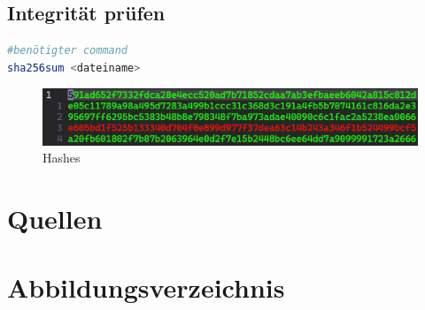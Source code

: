 \documentclass[a4paper]{article}
\begin{document}
\subsection{Integrität prüfen}
\begin{lstlisting}[language=bash]
#benötigter command
sha256sum <dateiname>
\end{lstlisting}

\begin{figure}[h]
	\includegraphics[scale=0.3]{images/hashes.png}
	\caption{Hashes}
\end{figure}



\newpage
\section{Quellen}

\newpage
\section{Abbildungsverzeichnis}

\listoffigures
\end{document}
